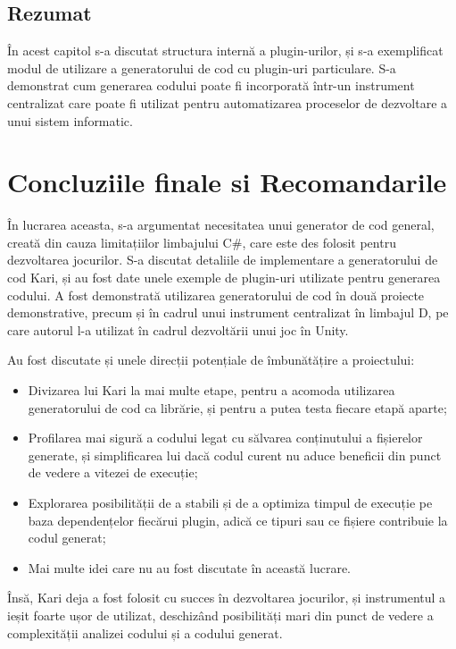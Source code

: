 \documentclass[a4paper,12pt]{report}
\begin{document}
\section{Rezumat}

În acest capitol s-a discutat structura internă a plugin-urilor, și s-a exemplificat modul de utilizare a generatorului de cod cu plugin-uri particulare.
S-a demonstrat cum generarea codului poate fi incorporată într-un instrument centralizat care poate fi utilizat pentru automatizarea proceselor de dezvoltare a unui sistem informatic.

\chapter{Concluziile finale si Recomandarile}

În lucrarea aceasta, s-a argumentat necesitatea unui generator de cod general, creată din cauza limitațiilor limbajului C\#, care este des folosit pentru dezvoltarea jocurilor.
S-a discutat detaliile de implementare a generatorului de cod Kari, și au fost date unele exemple de plugin-uri utilizate pentru generarea codului.
A fost demonstrată utilizarea generatorului de cod în două proiecte demonstrative, precum și în cadrul unui instrument centralizat în limbajul D, pe care autorul l-a utilizat în cadrul dezvoltării unui joc în Unity. 


Au fost discutate și unele direcții potențiale de îmbunătățire a proiectului:

\begin{itemize}
  \item Divizarea lui Kari la mai multe etape, pentru a acomoda utilizarea generatorului de cod ca librărie, și pentru a putea testa fiecare etapă aparte;
  \item Profilarea mai sigură a codului legat cu sălvarea conținutului a fișierelor generate, și simplificarea lui dacă codul curent nu aduce beneficii din punct de vedere a vitezei de execuție;
  \item Explorarea posibilității de a stabili și de a optimiza timpul de execuție pe baza dependențelor fiecărui plugin, adică ce tipuri sau ce fișiere contribuie la codul generat;
  \item Mai multe idei care nu au fost discutate în această lucrare.
\end{itemize}

Însă, Kari deja a fost folosit cu succes în dezvoltarea jocurilor, și instrumentul a ieșit foarte ușor de utilizat, deschizând posibilități mari din punct de vedere a complexității analizei codului și a codului generat.
\end{document}
